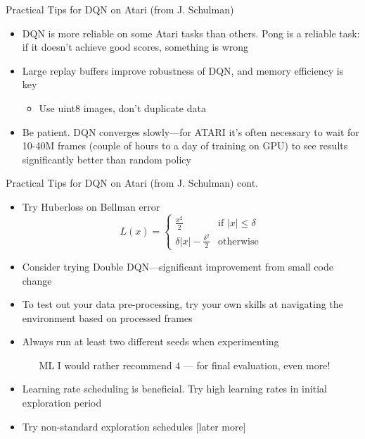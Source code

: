 \begin{frame}[c]{Practical Tips for DQN on Atari (from J. Schulman)}
	
	\begin{itemize}
		\item DQN is more reliable on some Atari tasks than others. Pong is a
		reliable task: if it doesn’t achieve good scores, something is wrong
		\item Large replay buffers improve robustness of DQN, and memory
		efficiency is key
		\begin{itemize}
			\item Use uint8 images, don’t duplicate data
		\end{itemize}
		\item Be patient. DQN converges slowly—for ATARI it’s often necessary to
		wait for 10-40M frames (couple of hours to a day of training on GPU)
		to see results significantly better than random policy
	\end{itemize}
	
\end{frame}
\begin{frame}[c]{Practical Tips for DQN on Atari (from J. Schulman) cont.}
	
	\begin{itemize}
		\item Try Huberloss on Bellman error
		$$L(x) =  \begin{cases}
		\frac{x^2}{2} & \text{if } |x| \leq \delta\\
		\delta |x| - \frac{\delta^2}{2} & \text{otherwise}
		\end{cases}
		$$
		\item Consider trying Double DQN—significant improvement from small
		code change 
		\item To test out your data pre-processing, try your own skills at navigating
		the environment based on processed frames
		\item Always run at least two different seeds when experimenting
		\begin{itemize}
			\item [ML] I would rather recommend $4$ --- for final evaluation, even more!
		\end{itemize}
		\item Learning rate scheduling is beneficial. Try high learning rates in initial
		exploration period
		\item Try non-standard exploration schedules [later more]
	\end{itemize}
	
\end{frame}

